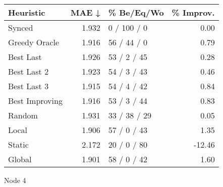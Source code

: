 \begin{tabular}{lrlr}
\toprule
\textbf{Heuristic} & \textbf{MAE ↓} & \textbf{\% Be/Eq/Wo} & \textbf{\% Improv.} \\
\midrule
            Synced &          1.932 &          0 / 100 / 0 &                0.00 \\
     Greedy Oracle &          1.916 &          56 / 44 / 0 &                0.79 \\
         Best Last &          1.926 &          53 / 2 / 45 &                0.28 \\
       Best Last 2 &          1.923 &          54 / 3 / 43 &                0.46 \\
       Best Last 3 &          1.915 &          54 / 4 / 42 &                0.84 \\
    Best Improving &          1.916 &          53 / 3 / 44 &                0.83 \\
            Random &          1.931 &         33 / 38 / 29 &                0.05 \\
             Local &          1.906 &          57 / 0 / 43 &                1.35 \\
            Static &          2.172 &          20 / 0 / 80 &              -12.46 \\
            Global &          1.901 &          58 / 0 / 42 &                1.60 \\
\bottomrule
\end{tabular}
\caption{Node 4}
\label{tab:ds_iid_lr01_le1_bs4_4}
